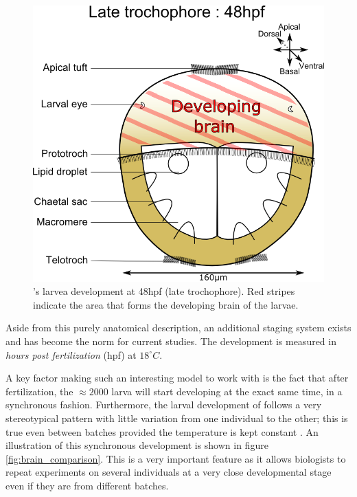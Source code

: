 \begin{figure}[bth]
\begin{center}
  \includegraphics[width=0.6\linewidth]{gfx/chapter1/larvae48hpf.png}
\end{center}
  \caption{\platyfull{}'s larvea development at 48hpf (late trochophore). Red stripes indicate the area that forms the developing brain of the larvae.}
  \label{fig:platynereis_larvae_scheme}
\end{figure}
    
    Aside from this purely anatomical description, an additional staging system exists and has become the norm for current studies. The development is measured in \textit{hours post fertilization} (hpf) at $18^{\circ}C$.
    
    A key factor making \platy{} such an interesting model to work with is the fact that after fertilization, the $\approx 2000$ larva will start developing at the exact same time, in a synchronous fashion. Furthermore, the larval development of \platy{} follows a very stereotypical pattern with little variation from one individual to the other; this is true even between batches provided the temperature is kept constant \cite{fischer04,dorresteijn90}. An illustration of this synchronous development is shown in figure \ref{fig:brain_comparison}. This is a very important feature as it allows biologists to repeat experiments on several individuals at a very close developmental stage even if they are from different batches.\\
    
